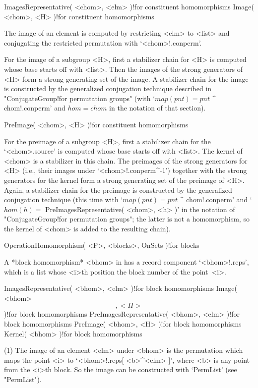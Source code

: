 \>ImagesRepresentative( <chom>, <elm> )!{for constituent homomorphisms}
\>Image( <chom>, <H> )!{for constituent homomorphisms}

The image  of an element is  computed by restricting  <elm> to <list> and
conjugating the restricted permutation with `<chom>!.conperm'.

For  the image of  a subgroup <H>, first  a  stabilizer chain  for <H> is
computed whose base starts off with <list>. Then the images of the strong
generators of <H> form a strong generating set of the image. A stabilizer
chain for  the  image   is constructed   by the generalized   conjugation
technique described  in   "ConjugateGroup!for permutation  groups"  (with
`$map(pnt) =  pnt$ ^ chom!.conperm' and $hom  = chom$ in the  notation of
that section).

\>PreImage( <chom>, <H> )!{for constituent homomorphisms}

For  the preimage of a subgroup  <H>,  first a  stabilizer  chain for the
`<chom>.source' is computed whose base starts off with <list>. The kernel
of <chom> is  a stabilizer in  this chain.  The  preimages of the  strong
generators for    <H> (i.e.,  their  images  under  `<chom>!.conperm^-1')
together  with  the strong  generators   for  the  kernel form  a  strong
generating set of the preimage of <H>. Again,  a stabilizer chain for the
preimage  is constructed by  the  generalized conjugation technique (this
time   with  `$map(pnt) =   pnt$   ^  chom!.conperm'   and `$hom(h)    =$
PreImagesRepresentative(   <chom>,   <h>    )'  in   the     notation  of
"ConjugateGroup!for  permutation   groups";   the   latter  is  not     a
homomorphism, so the kernel of <chom> is added to the resulting chain).

\stars

\>OperationHomomorphism( <P>, <blocks>, OnSets )!{for blocks}

A  *block   homomorphism* <bhom>  in   {\GAP}    has a record   component
`<bhom>!.reps', which is a list whose  <i>th position the block number of
the point~<i>.

\>ImagesRepresentative( <bhom>, <elm> )!{for block homomorphisms}
\>Image( <bhom> \[, <H> \] )!{for block homomorphisms}
\>PreImagesRepresentative( <bhom>, <elm> )!{for block homomorphisms}
\>PreImage( <bhom>, <H> )!{for block homomorphisms}
\>Kernel( <bhom> )!{for block homomorphisms}

(1) The image of an element  <elm> under <bhom>  is the permutation which
maps the point <i> to `<bhom>!.reps[ <b>^<elm> ]', where <b> is any point
from the <i>th block. So  the image  can  be constructed with  `PermList'
(see "PermList").

